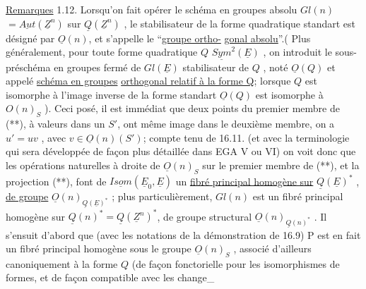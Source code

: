 \uline{Remarques} 1.12. Lorsqu'on fait opérer le schéma en groupes absolu
$Gl(n)$  $= \underline{Aut}(\underline{Z}^n )$ sur $\underline{Q}(\underline{Z}^n)$ , le stabilisateur de la forme
quadratique standart est désigné par $\underline{O}(n)$, et s'appelle le ``\uline{groupe ortho-}%
\uline{gonal absolu}''.( Plus généralement, pour toute forme quadratique $Q$ \hand{$\in$}
 $\underline{Sym}^2(\underline{E})$ , on introduit le sous-préschéma en groupes fermé de
$Gl(\underline{E})$  stabilisateur de $Q$ , noté $\underline{O}(Q)$ et appelé \uline{schéma en groupes}
\uline{orthogonal relatif à la forme Q}; lorsque $Q$ est isomorphe à l'image
inverse de la forme standart \hand{,} $\underline{O}(Q)$ est isomorphe à $O(n)_S$ ). Ceci posé,
il est immédiat que deux points  du premier membre de (**), à valeurs dans
un $S'$, ont même image dans le deuxième membre,  
 on a $u' = uv$ , avec $v \in \underline{O}(n)(S')$; compte tenu de 16.11. (et
avec la terminologie qui sera développée de façon plus détaillée dans
EGA V ou VI) on voit donc que les opérations naturelles à droite de
$\underline{O}(n)_S$ sur le premier membre de (**), et la projection (**), font de
$\underline{Isom}(\underline{E}_0,\underline{E})$ un \uline{fibré principal homogène sur} $\underline{Q}(\underline{E})^*$ , \uline{de groupe} $\underline{O}(n)_{\underline{Q}(\underline{E})^*}$ ;
plus particulièrement,  $Gl(n)$ est un fibré principal
homogène sur $\underline{Q}(n)^* = \underline{Q}(\underline{Z}^n)^*$, de groupe structural $\underline{O}(n)_{\underline{Q}(n)^*}$ . Il
s'ensuit  d'abord que (avec les notations de la démonstration de 16.9)
P est en fait un fibré principal homogène sous le groupe $\underline{O}(n)_S$ , associé
 d'ailleurs canoniquement à la forme $Q$ (de façon fonctorielle
pour les isomorphismes de formes, et de façon compatible avec les change\_%

